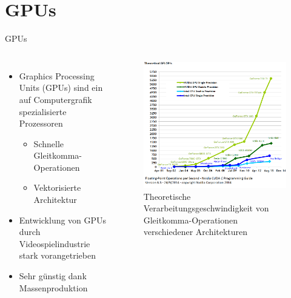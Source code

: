 \documentclass[10pt]{beamer}
\begin{document}
\section{GPUs}

\begin{frame}{GPUs}
  \begin{columns}
      \begin{itemize}
        \item Graphics Processing Units (GPUs) sind ein auf Computergrafik
              spezialisierte Prozessoren
        \begin{itemize}
          \item Schnelle Gleitkomma-Operationen
          \item Vektorisierte Architektur
        \end{itemize}
        \item Entwicklung von GPUs durch Videospielindustrie stark
              vorangetrieben
        \item Sehr günstig dank Massenproduktion
      \end{itemize}
      \begin{figure}
        \centering
        \includegraphics[width=\linewidth]{figures/fg-flops.png}
        \caption{Theoretische Verarbeitungsgeschwindigkeit von
                 Gleitkomma-Operationen verschiedener
                 Architekturen\footnotemark[1]}
      \end{figure}
  \end{columns}

\end{frame}
\end{document}
